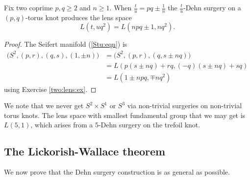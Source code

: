 \begin{cor}
Fix two coprime $p,q \geqslant 2$ and $n\geqslant 1$. When $\frac tu = pq \pm \frac 1n$ the $\frac tu$-Dehn surgery on a $(p,q)$-torus knot produces the lens space 
$$L(t,uq^2) = L(npq \pm 1, nq^2).$$
\end{cor}
\begin{proof}
The Seifert manifold (\ref{Stu:eqn}) is
\begin{align*}
\big(S^2, (p,r), (q,s), (1, \pm n) \big) & = \big(S^2, (p,r), (q,s \pm nq) \big) \\
& = L(p(s\pm nq) +rq, (-q)(s\pm nq) + sq) \\
& = L(1 \pm npq, \mp nq^2)
\end{align*}
using Exercise \ref{two:lens:ex}.
\end{proof}
We note that we never get $S^2\times S^1$ or $S^3$ via non-trivial surgeries on non-trivial torus knots. The lens space with smallest fundamental group that we may get is $L(5,1)$, which arises from a $5$-Dehn surgery on the trefoil knot.


\subsection{The Lickorish-Wallace theorem}
We now prove that the Dehn surgery construction is as general as possible.

